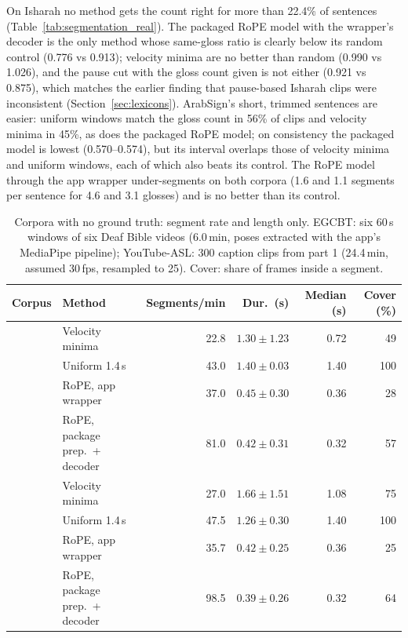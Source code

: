On Isharah no method gets the count right for more than 22.4\% of sentences (Table~\ref{tab:segmentation_real}).
The packaged RoPE model with the wrapper's decoder is the only method whose same-gloss ratio is clearly below its
random control (0.776 vs 0.913); velocity minima are no better than random (0.990 vs 1.026), and the pause cut with
the gloss count given is not either (0.921 vs 0.875), which matches the earlier finding that pause-based
Isharah clips were inconsistent (Section~\ref{sec:lexicons}). ArabSign's short, trimmed sentences are easier: uniform
windows match the gloss count in 56\% of clips and velocity minima in 45\%, as does the packaged RoPE model; on
consistency the packaged model is lowest (0.570--0.574), but its interval overlaps those of velocity minima and uniform windows,
each of which also beats its control. The RoPE model through the app wrapper under-segments on both corpora (1.6
and 1.1 segments per sentence for 4.6 and 3.1 glosses) and is no better than its control.

\begin{table}[ht]
\centering\scriptsize
\caption{Corpora with no ground truth: segment rate and length only. EGCBT: six 60\,s windows of six Deaf Bible
videos (6.0\,min, poses extracted with the app's MediaPipe pipeline); YouTube-ASL: 300 caption clips from part 1
(24.4\,min, assumed 30\,fps, resampled to 25). Cover: share of frames inside a segment.}
\label{tab:segmentation_nogt}
\setlength{\tabcolsep}{3pt}
\begin{tabularx}{\textwidth}{l Y r r r r}
\toprule
\textbf{Corpus} & \textbf{Method} & \textbf{Segments/min} & \textbf{Dur.\ (s)} & \textbf{Median (s)} & \textbf{Cover (\%)} \\
\midrule
{}
 & Velocity minima & 22.8 & $1.30 \pm 1.23$ & 0.72 & 49 \\
 & Uniform 1.4\,s & 43.0 & $1.40 \pm 0.03$ & 1.40 & 100 \\
 & RoPE, app wrapper & 37.0 & $0.45 \pm 0.30$ & 0.36 & 28 \\
 & RoPE, package prep.\ + decoder & 81.0 & $0.42 \pm 0.31$ & 0.32 & 57 \\
\midrule
{}
 & Velocity minima & 27.0 & $1.66 \pm 1.51$ & 1.08 & 75 \\
 & Uniform 1.4\,s & 47.5 & $1.26 \pm 0.30$ & 1.40 & 100 \\
 & RoPE, app wrapper & 35.7 & $0.42 \pm 0.25$ & 0.36 & 25 \\
 & RoPE, package prep.\ + decoder & 98.5 & $0.39 \pm 0.26$ & 0.32 & 64 \\
\bottomrule
\end{tabularx}
\end{table}

